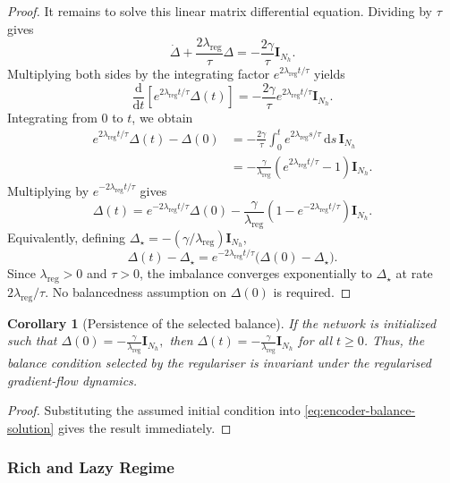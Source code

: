 \documentclass{article} %
\newtheorem{corollary}[theorem]{Corollary}
\theoremstyle{remark}
\begin{document}
\begin{proof}
It remains to solve this linear matrix differential equation.
Dividing by $\tau$ gives
\[
\dot{\Delta}
+
\frac{2\lambda_{\mathrm{reg}}}{\tau}\Delta
=
-\frac{2\gamma}{\tau}\mathbf{I}_{N_h}.
\]
Multiplying both sides by the integrating factor
$e^{2\lambda_{\mathrm{reg}}t/\tau}$ yields
\[
\frac{\mathrm{d}}{\mathrm{d}t}
\left[
e^{2\lambda_{\mathrm{reg}}t/\tau}\Delta(t)
\right]
=
-\frac{2\gamma}{\tau}
e^{2\lambda_{\mathrm{reg}}t/\tau}
\mathbf{I}_{N_h}.
\]
Integrating from $0$ to $t$, we obtain
\begin{align*}
e^{2\lambda_{\mathrm{reg}}t/\tau}\Delta(t)-\Delta(0)
&=
-\frac{2\gamma}{\tau}
\int_0^t
e^{2\lambda_{\mathrm{reg}}s/\tau}
\,\mathrm{d}s\,
\mathbf{I}_{N_h}
\\
&=
-\frac{\gamma}{\lambda_{\mathrm{reg}}}
\left(
e^{2\lambda_{\mathrm{reg}}t/\tau}-1
\right)
\mathbf{I}_{N_h}.
\end{align*}
Multiplying by $e^{-2\lambda_{\mathrm{reg}}t/\tau}$ gives
\[
\Delta(t)
=
e^{-2\lambda_{\mathrm{reg}}t/\tau}\Delta(0)
-
\frac{\gamma}{\lambda_{\mathrm{reg}}}
\left(
1-e^{-2\lambda_{\mathrm{reg}}t/\tau}
\right)
\mathbf{I}_{N_h}.
\]
Equivalently, defining
$\Delta_\star=-(\gamma/\lambda_{\mathrm{reg}})\mathbf{I}_{N_h}$,
\[
\boxed{
\Delta(t)-\Delta_\star
=
e^{-2\lambda_{\mathrm{reg}}t/\tau}
\bigl(\Delta(0)-\Delta_\star\bigr)
}.
\]
Since $\lambda_{\mathrm{reg}}>0$ and $\tau>0$, the imbalance
converges exponentially to $\Delta_\star$ at rate
$2\lambda_{\mathrm{reg}}/\tau$.
No balancedness assumption on $\Delta(0)$ is required.
\end{proof}

\begin{corollary}[Persistence of the selected balance]
\label{cor:selected-balance-persistence}
If the network is initialized such that
$
\Delta(0)
=
-\frac{\gamma}{\lambda_{\mathrm{reg}}}
\mathbf{I}_{N_h},
$
then
$
\Delta(t)
=
-\frac{\gamma}{\lambda_{\mathrm{reg}}}
\mathbf{I}_{N_h}
$
for all \(t\geq0\). Thus, the balance condition selected by the
regulariser is invariant under the regularised gradient-flow dynamics.
\end{corollary}

\begin{proof}
Substituting the assumed initial condition into
\eqref{eq:encoder-balance-solution} gives the result immediately.
\end{proof}


\subsubsection{Rich and Lazy Regime}
\label{app:rich_lazy}
\end{document}
